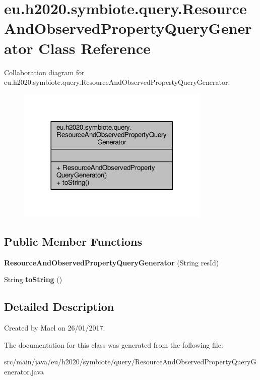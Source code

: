 \hypertarget{classeu_1_1h2020_1_1symbiote_1_1query_1_1ResourceAndObservedPropertyQueryGenerator}{}\section{eu.\+h2020.\+symbiote.\+query.\+Resource\+And\+Observed\+Property\+Query\+Generator Class Reference}
\label{classeu_1_1h2020_1_1symbiote_1_1query_1_1ResourceAndObservedPropertyQueryGenerator}


Collaboration diagram for eu.\+h2020.\+symbiote.\+query.\+Resource\+And\+Observed\+Property\+Query\+Generator\+:
\nopagebreak
\begin{figure}[H]
\begin{center}
\leavevmode
\includegraphics[width=261pt]{classeu_1_1h2020_1_1symbiote_1_1query_1_1ResourceAndObservedPropertyQueryGenerator__coll__graph}
\end{center}
\end{figure}
\subsection*{Public Member Functions}
\begin{DoxyCompactItemize}
\item 
{\bfseries Resource\+And\+Observed\+Property\+Query\+Generator} (String res\+Id)\hypertarget{classeu_1_1h2020_1_1symbiote_1_1query_1_1ResourceAndObservedPropertyQueryGenerator_a56889c8e719deac65e4b4b383c0429dd}{}\label{classeu_1_1h2020_1_1symbiote_1_1query_1_1ResourceAndObservedPropertyQueryGenerator_a56889c8e719deac65e4b4b383c0429dd}

\item 
String {\bfseries to\+String} ()\hypertarget{classeu_1_1h2020_1_1symbiote_1_1query_1_1ResourceAndObservedPropertyQueryGenerator_a5f8ee788f623760977f48e3788fdb0fd}{}\label{classeu_1_1h2020_1_1symbiote_1_1query_1_1ResourceAndObservedPropertyQueryGenerator_a5f8ee788f623760977f48e3788fdb0fd}

\end{DoxyCompactItemize}


\subsection{Detailed Description}
Created by Mael on 26/01/2017. 

The documentation for this class was generated from the following file\+:\begin{DoxyCompactItemize}
\item 
src/main/java/eu/h2020/symbiote/query/Resource\+And\+Observed\+Property\+Query\+Generator.\+java\end{DoxyCompactItemize}
